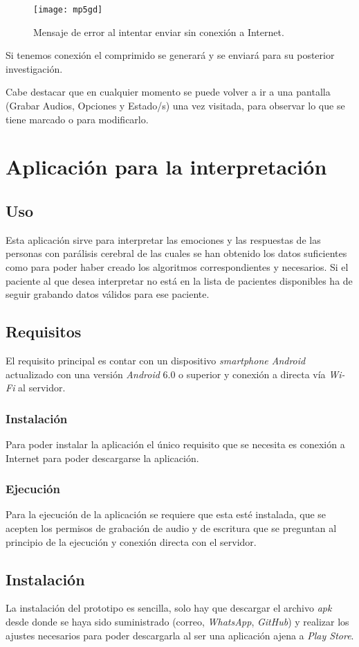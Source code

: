 \begin{figure}[H]
	\centering
	\texttt{[image: mp5gd]}
	\caption{Mensaje de error al intentar enviar sin conexión a Internet.}
	\label{fig:mp5gd}
\end{figure}

Si tenemos conexión el comprimido se generará y se enviará para su posterior investigación.

Cabe destacar que en cualquier momento se puede volver a ir a una pantalla (Grabar Audios, Opciones y Estado/s) una vez visitada, para observar lo que se tiene marcado o para modificarlo.
\section{Aplicación para la interpretación}
\subsection{Uso}
Esta aplicación sirve para interpretar las emociones y las respuestas de las personas con parálisis cerebral de las cuales se han obtenido los datos suficientes como para poder haber creado los algoritmos correspondientes y necesarios. Si el paciente al que desea interpretar no está en la lista de pacientes disponibles ha de seguir grabando datos válidos para ese paciente.
\subsection{Requisitos}
El requisito principal es contar con un dispositivo \textit{smartphone Android} actualizado con una versión \textit{Android} 6.0 o superior y conexión a directa vía \textit{Wi-Fi} al servidor.
\subsubsection{Instalación}
Para poder instalar la aplicación el único requisito que se necesita es conexión a Internet para poder descargarse la aplicación.
\subsubsection{Ejecución}
Para la ejecución de la aplicación se requiere que esta esté instalada, que se acepten los permisos de grabación de audio y de escritura que se preguntan al principio de la ejecución y conexión directa con el servidor.
\subsection{Instalación}
La instalación del prototipo es sencilla, solo hay que descargar el archivo \textit{apk} desde donde se haya sido suministrado (correo, \textit{WhatsApp}, \textit{GitHub}) y realizar los ajustes necesarios para poder descargarla al ser una aplicación ajena a \textit{Play Store}.

